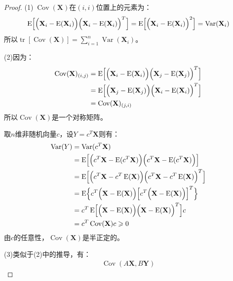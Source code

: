 \begin{proof}
	(1)$\;\operatorname{Cov}(\mathbf{X})$在$(i,i)$位置上的元素为：
	\begin{equation*}
		\operatorname{E}\Bigl[\Bigl(\mathbf{X}_i-\operatorname{E}(\mathbf{X}_i)\Bigr)\Bigl(\mathbf{X}_i-\operatorname{E}(\mathbf{X}_i)\Bigr)^T\Bigr]=\operatorname{E}\Bigl[\Bigl(\mathbf{X}_i-\operatorname{E}(\mathbf{X}_i)\Bigr)^2\Bigr]=\operatorname{Var}(\mathbf{X}_i)
	\end{equation*}
	所以$\operatorname{tr}[\operatorname{Cov}(\mathbf{X})]=\sum\limits_{i=1}^{n}\operatorname{Var}(\mathbf{X}_i)$。\par
	(2)因为：
	\begin{align*}
	\operatorname{Cov}(\mathbf{X})_{(i,j)}
	&=\operatorname{E}\Bigl[\Bigl(\mathbf{X}_i-\operatorname{E}(\mathbf{X}_i)\Bigr)\Bigl(\mathbf{X}_j-\operatorname{E}(\mathbf{X}_j)\Bigr)^T\Bigr] \\
	&=\operatorname{E}\Bigl[\Bigl(\mathbf{X}_j-\operatorname{E}(\mathbf{X}_j)\Bigr)\Bigl(\mathbf{X}_i-\operatorname{E}(\mathbf{X}_i)\Bigr)^T\Bigr] \\
	&=\operatorname{Cov}(\mathbf{X})_{(j,i)}
	\end{align*}
	所以$\operatorname{Cov}(\mathbf{X})$是一个对称矩阵。\par
	取$n$维非随机向量$c$，设$Y=c^T\mathbf{X}$则有：
	\begin{align*}
		\operatorname{Var}(Y)
		&=\operatorname{Var}(c^T\mathbf{X}) \\
		&=\operatorname{E}\Bigl[\Bigl(c^T\mathbf{X}-\operatorname{E}(c^T\mathbf{X})\Bigr)\Bigl(c^T\mathbf{X}-\operatorname{E}(c^T\mathbf{X})\Bigr)\Bigr] \\
		&=\operatorname{E}\Bigl[\Bigl(c^T\mathbf{X}-c^T\operatorname{E}(\mathbf{X})\Bigr)\Bigl(c^T\mathbf{X}-c^T\operatorname{E}(\mathbf{X})\Bigr)^T\Bigr] \\
		&=\operatorname{E}\Bigl\{c^T\Bigl(\mathbf{X}-\operatorname{E}(\mathbf{X})\Bigr)\Bigl[c^T\Bigl(\mathbf{X}-\operatorname{E}(\mathbf{X})\Bigr)\Bigr]^T\Bigr\} \\
		&=c^T\operatorname{E}\Bigl[\Bigl(\mathbf{X}-\operatorname{E}(\mathbf{X})\Bigr)\Bigl(\mathbf{X}-\operatorname{E}(\mathbf{X})\Bigr)^T\Bigr]c \\
		&=c^T\operatorname{Cov}(\mathbf{X})c\geqslant0
	\end{align*}
	由$c$的任意性，$\operatorname{Cov}(\mathbf{X})$是半正定的。\par
	(3)类似于(2)中的推导，有：
	\begin{align*}
		\operatorname{Cov}(A\mathbf{X},B\mathbf{Y})

\end{align*}
\end{proof}

